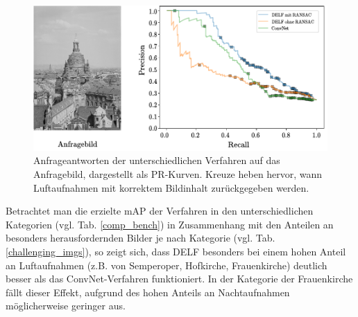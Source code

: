 \begin{figure}[h]
\centering
\includegraphics[scale=1.0]{aerial_pr}
\caption{Anfrageantworten der unterschiedlichen Verfahren auf das Anfragebild, dargestellt als PR-Kurven. Kreuze heben hervor, wann Luftaufnahmen mit korrektem Bildinhalt zurückgegeben werden.}
\label{aerial_pr}
\end{figure}
Betrachtet man die erzielte mAP der Verfahren in den unterschiedlichen Kategorien (vgl. Tab. \ref{comp_bench}) in Zusammenhang mit den Anteilen an besonders herausfordernden Bilder je nach Kategorie (vgl. Tab. \ref{challenging_imgs}), so zeigt sich, dass DELF besonders bei einem hohen Anteil an Luftaufnahmen (z.B. von Semperoper, Hofkirche, Frauenkirche) deutlich besser als das ConvNet-Verfahren funktioniert. In der Kategorie der Frauenkirche fällt dieser Effekt, aufgrund des hohen Anteils an Nachtaufnahmen möglicherweise geringer aus.